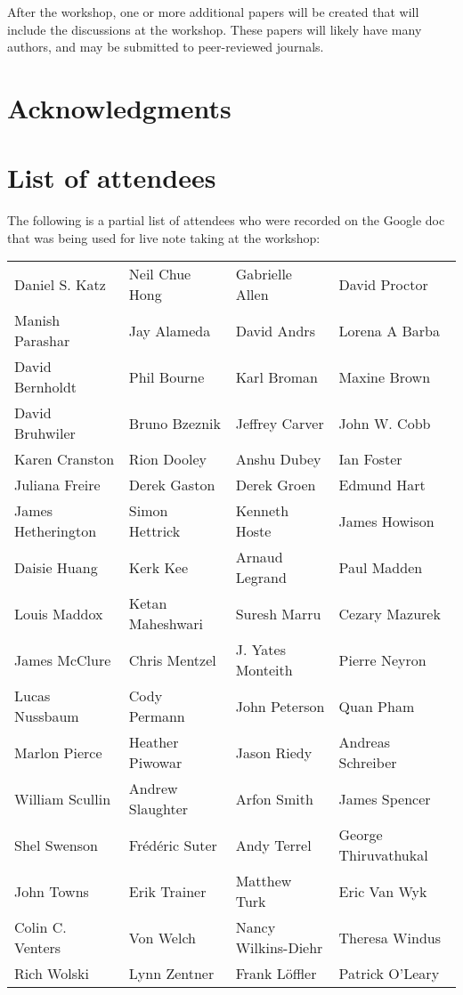\documentclass[11pt, oneside]{amsart}
\begin{document}
After the workshop, one or more additional papers will be created that
will include the discussions at the workshop. These papers will likely
have many authors, and may be submitted to peer-reviewed journals.


\section*{Acknowledgments}

\appendix
\section{List of attendees}

The following is a partial list of attendees who were recorded on the
Google doc that was being used for live note taking at the workshop:

\begin{tabular}{ L{4cm}  L{4cm}  L{4cm}  L{4cm} }
   Daniel S. Katz
&  Neil Chue Hong
&  Gabrielle Allen
&  David Proctor
\\ Manish Parashar
&  Jay Alameda
&  David Andrs
&  Lorena A Barba
\\ David Bernholdt
&  Phil Bourne
&  Karl Broman
&  Maxine Brown
\\ David Bruhwiler
&  Bruno Bzeznik
&  Jeffrey Carver
&  John W. Cobb
\\ Karen Cranston
&  Rion Dooley
&  Anshu Dubey
&  Ian Foster
\\Juliana Freire
& Derek Gaston
& Derek Groen
& Edmund Hart
\\James Hetherington
& Simon Hettrick
& Kenneth Hoste
& James Howison
\\Daisie Huang
& Kerk Kee
& Arnaud Legrand
& Paul Madden
\\Louis Maddox
& Ketan Maheshwari
& Suresh Marru
& Cezary Mazurek
\\James McClure
& Chris Mentzel
& J. Yates Monteith
& Pierre Neyron
\\Lucas Nussbaum
& Cody Permann
& John Peterson
& Quan Pham
\\Marlon Pierce
& Heather Piwowar
& Jason Riedy
& Andreas Schreiber
\\William Scullin
& Andrew Slaughter
& Arfon Smith
& James Spencer
\\Shel Swenson
& Fr\'{e}d\'{e}ric Suter
& Andy Terrel
& George  Thiruvathukal
\\John Towns
& Erik Trainer
& Matthew Turk
& Eric Van Wyk
\\Colin C. Venters
& Von Welch
& Nancy Wilkins-Diehr
& Theresa Windus
\\Rich Wolski
& Lynn Zentner
& Frank Löffler
& Patrick O'Leary
\end{tabular}






\end{document}
